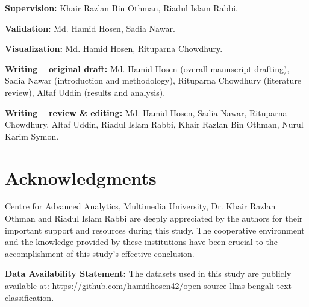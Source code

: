 \documentclass[10pt,letterpaper]{article}
\begin{document}
\textbf{Supervision:} Khair Razlan Bin Othman, Riadul Islam Rabbi.

\textbf{Validation:} Md. Hamid Hosen, Sadia Nawar.

\textbf{Visualization:} Md. Hamid Hosen, Rituparna Chowdhury.

\textbf{Writing – original draft:}  
Md. Hamid Hosen (overall manuscript drafting),  
Sadia Nawar (introduction and methodology),  
Rituparna Chowdhury (literature review),  
Altaf Uddin (results and analysis).

\textbf{Writing – review \& editing:}  
Md. Hamid Hosen, Sadia Nawar, Rituparna Chowdhury, Altaf Uddin,  
Riadul Islam Rabbi, Khair Razlan Bin Othman, Nurul Karim Symon.




\section*{Acknowledgments}
 Centre for Advanced Analytics, Multimedia University, Dr. Khair Razlan Othman and Riadul Islam Rabbi are deeply appreciated by the authors for their important support and resources during this study. The cooperative environment and the knowledge provided by these institutions have been crucial to the accomplishment of this study's effective conclusion.

 \noindent \textbf{Data Availability Statement:} 
The datasets used in this study are publicly available at: \url{https://github.com/hamidhosen42/open-source-llms-bengali-text-classification}.

\nolinenumbers

%
%


\end{document}
